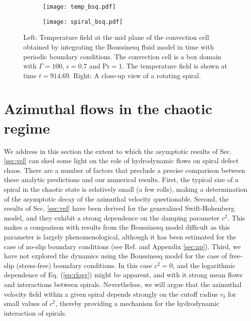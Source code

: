 \documentclass[preprint,prx,floatfix]{revtex4-1}
\begin{document}
\begin{figure}[htp]
	\centering
    \begin{subfigure}[b]{0.45\textwidth}
    \texttt{[image: temp\_bsq.pdf]}
    \end{subfigure}
    \begin{subfigure}[b]{0.45\textwidth}
    \texttt{[image: spiral\_bsq.pdf]}
    \end{subfigure}
    \caption{Left: Temperature field at the mid plane of the convection cell obtained by integrating the Boussinesq fluid model in time with periodic boundary conditions. The convection cell is a box domain with $\Gamma=100$, $\epsilon=0.7$ and $\text{Pr}=1$. The temperature field is shown at time $t=914.69$. Right: A close-up view of a rotating spiral.}
	\label{fig:bsqtemp}
\end{figure}


\section{Azimuthal flows in the chaotic regime}
\label{sec:azi}

We address in this section the extent to which the asymptotic results of Sec. \ref{sec:vel} can shed some light on the role of hydrodynamic flows on spiral defect chaos. There are a number of factors that preclude a precise comparison between these analytic predictions and our numerical results. First, the typical size of a spiral in the chaotic state is relatively small (a few rolls), making a determination of the asymptotic decay of the azimuthal velocity questionable. Second, the results of Sec. \ref{sec:vel} have been derived for the generalized Swift-Hohenberg model, and they exhibit a strong dependence on the damping parameter $c^{2}$. This makes a comparison with results from the Boussinesq model difficult as this parameter is largely phenomenological, although it has been estimated for the case of no-slip boundary conditions (see Ref. \cite{manneville1984modelisation} and Appendix \ref{sec:ap}). Third, we have not explored the dynamics using the Boussinesq model for the case of free-slip (stress-free) boundary conditions. In this case $c^{2} = 0$, and the logarithmic dependence of Eq. (\ref{eq:rlogr}) might be apparent, and with it strong mean flows and interactions between spirals. Nevertheless, we will argue that the azimuthal velocity field within a given spiral depends strongly on the cutoff radius $r_{b}$ for small values of $c^{2}$, thereby providing a mechanism for the hydrodynamic interaction of spirals.
\end{document}
